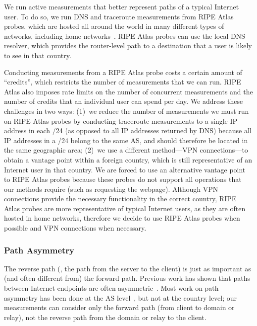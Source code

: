 We run active measurements that better represent paths of a typical Internet user. To do so, we run
DNS and traceroute measurements from RIPE Atlas probes, which are hosted
all around the world in many different types of networks, including home
networks~\cite{ripe_atlas}.  RIPE Atlas probes can use the local DNS
resolver, which provides the router-level path to a destination that a user is
 likely to see in that country.  

Conducting measurements from a RIPE Atlas probe costs a certain
amount of ``credits'', which restricts the number of measurements that we
can run.  RIPE Atlas also imposes rate limits on the number of
concurrent measurements and the number of credits that an individual
user can spend per day.  We address these challenges in two ways: (1)~we
reduce the number of measurements we must run on RIPE Atlas
probes by conducting traceroute measurements to a single IP address in
each /24 (as opposed to all IP addresses returned by DNS) because all IP
addresses in a /24 belong to the same AS, and should therefore be
located in the same geographic area; (2)~we use a different method---VPN
connections---to obtain a vantage point within a foreign country, which
is still representative of an Internet user in that country.  We are forced to 
use an alternative vantage point to RIPE Atlas probes because these probes 
do not support all operations that our methods require (such as requesting 
the webpage).  Although VPN connections provide the necessary functionality in 
the correct country, RIPE Atlas probes are more representative of typical 
Internet users, as they are often hosted in home networks, therefore we decide
 to use RIPE Atlas probes when possible and VPN connections when necessary.  

\subsubsection{Path Asymmetry}
\label{path_sym}

The reverse path (\ie, the path from the server to the client) is just as important
as (and often different from) the
forward path.   Previous work has shown that paths between Internet endpoints
are often asymmetric~\cite{he2005routing}.  Most work on path asymmetry has
been done at the AS level~\cite{paxson1997end,gao2001inferring,he2005routing,he2004quantifying}, but not at the country level; our measurements can
consider only the forward path (from client to domain or relay), not the
reverse path from the domain or relay to the client.

